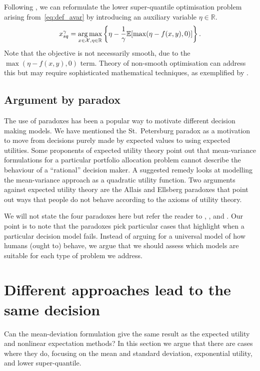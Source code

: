 \documentclass[main.tex]{subfiles}
\begin{document}
\begin{example}
  Following \citet{ben2007old}, we can reformulate the lower
  super-quantile optimisation problem arising from~\eqref{eq:def_avar}
  by introducing an auxiliary variable $\eta\in\mathbb{R}$.
  \begin{equation}\label{eq:opt_avar}
    x_{sq}^{\gamma}
    =\operatorname*{arg\,max}_{x\in\mathcal{X},\eta\in\mathbb{R}}
    \left\{\eta - \frac{1}{\gamma}\mathbb{E}[\max(\eta-f(x,y),0)]\right\}.
  \end{equation}
  Note that the objective is not necessarily smooth, due to the
  $\max(\eta-f(x,y),0)$ term. Theory of non-smooth optimisation
  can address this but may require sophisticated mathematical techniques, as
  exemplified by \citet{kouri2016risk}.
\end{example}


\subsection{Argument by paradox}
The use of paradoxes has been a popular way to motivate different
decision making models. We have mentioned the St.~Petersburg paradox
as a motivation to move from decisions purely made by expected values
to using expected utilities.  Some proponents of expected utility
theory point out that mean-variance formulations for a particular
portfolio allocation problem cannot describe the behaviour of a
``rational'' decision maker. A suggested remedy looks at modelling the
mean-variance approach as a quadratic utility function.  Two arguments
against expected utility theory are the Allais and Ellsberg paradoxes
that point out ways that people do not behave according to the axioms
of utility theory.

We will not state the four paradoxes here but refer the reader to
\citet{ellsberg1961risk}, \citet{follmer2004stochastic}, and
\citet{johnstone2013mean}.  Our point is to note that the
paradoxes pick particular cases that highlight when a particular
decision model fails. Instead of arguing for a universal model of how
humans (ought to) behave, we argue that we should assess which models
are suitable for each type of problem we address.


\section{Different approaches lead to the same decision}\label{sec:one_comparison_orderings}
Can the mean-deviation formulation give the
same result as the expected utility and nonlinear expectation methods?
In this section we argue that there are cases where they do,
focusing on the mean and standard deviation, exponential
utility, and lower super-quantile.
\end{document}
